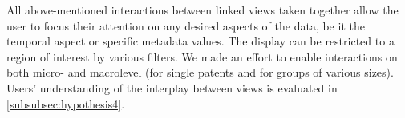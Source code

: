 All above-mentioned interactions between linked views taken together allow the user to focus their attention on any desired aspects of the data, be it the temporal aspect or specific metadata values.
The display can be restricted to a region of interest by various filters.
We made an effort to enable interactions on both micro- and macrolevel (for single patents and for groups of various sizes).
Users' understanding of the interplay between views is evaluated in \autoref{subsubsec:hypothesis4}.